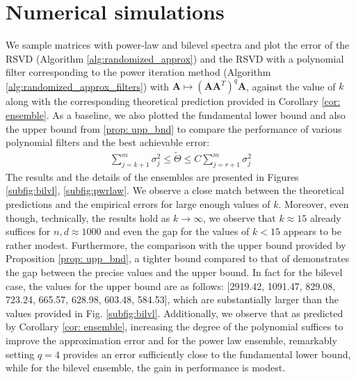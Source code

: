 \documentclass[conference]{IEEEtran}
\newcommand{\tTheta}{\tilde{\Theta}}
\newcommand{\bA}{\mathbf{A}}
\begin{document}
\section{Numerical simulations}

We sample matrices with power-law and bilevel spectra and plot the error of the RSVD (Algorithm \ref{alg:randomized_approx}) and the RSVD with a polynomial filter corresponding to the power iteration method (Algorithm \ref{alg:randomized_approx_filters}) with $\bA \mapsto (\bA\bA^T)^q \bA$, against the value of $k$ along with the corresponding theoretical prediction provided in Corollary \ref{cor: ensemble}. As a baseline, we also plotted the fundamental lower bound and also the upper bound from \ref{prop: upp_bnd} to compare the performance of various polynomial filters and the best achievable error:
\begin{align*}
   \sum_{j = k + 1}^m \sigma_j^2 \le  \tTheta \le C \sum_{j = r + 1}^m \sigma_j^2
\end{align*}
The results and the details of the ensembles are presented in Figures \ref{subfig:bilvl}, \ref{subfig:pwrlaw}. We observe a close match between the theoretical predictions and the empirical errors for large enough values of $k$. Moreover, even though, technically, the results hold as $k \to \infty$, we observe that $k \approx 15$ already suffices for $n,d \approx 1000$ and even the gap for the values of $k < 15$ appears to be rather modest. Furthermore, the comparison with the upper bound provided by Proposition \ref{prop: upp_bnd}, a tighter bound compared to that of \cite{halko2011finding, tropp2023randomized} demonstrates the gap between the precise values and the upper bound. In fact for the bilevel case, the values for the upper bound are as follows: [2919.42, 1091.47, 829.08, 723.24,  665.57, 628.98, 603.48, 584.53], which are substantially larger than the values provided in Fig. \ref{subfig:bilvl}. Additionally, we observe that as predicted by Corollary \ref{cor: ensemble}, increasing the degree of the polynomial suffices to improve the approximation error and for the power law ensemble, remarkably setting $q=4$ provides an error sufficiently close to the fundamental lower bound, while for the bilevel ensemble, the gain in performance is modest.

\end{document}
